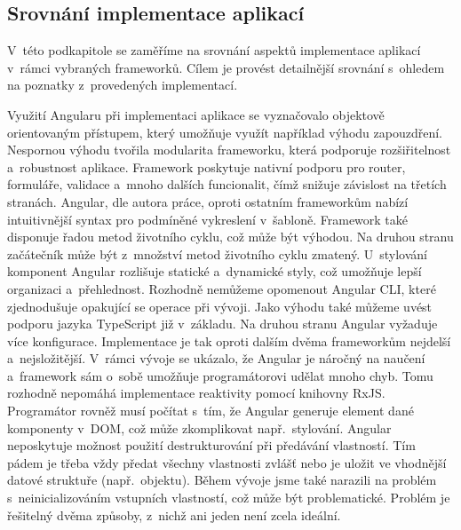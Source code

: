 \subsection{Srovnání implementace aplikací}

V~této podkapitole se zaměříme na srovnání aspektů implementace aplikací v~rámci vybraných frameworků. 
Cílem je provést detailnější srovnání s~ohledem na poznatky z~provedených implementací. 

Využití Angularu při implementaci aplikace se vyznačovalo objektově orientovaným přístupem, který umožňuje využít například výhodu zapouzdření. 
Nespornou výhodu tvořila modularita frameworku, která podporuje rozšiřitelnost a~robustnost aplikace. 
Framework poskytuje nativní podporu pro router, formuláře, validace a~mnoho dalších funcionalit, čímž snižuje závislost na třetích stranách. 
Angular, dle autora práce, oproti ostatním frameworkům nabízí intuitivnější syntax pro podmíněné vykreslení v~šabloně. 
Framework také disponuje řadou metod životního cyklu, což může být výhodou. Na druhou stranu začátečník může být z~množství metod životního cyklu zmatený. 
U~stylování komponent Angular rozlišuje statické a~dynamické styly, což umožňuje lepší organizaci a~přehlednost. 
Rozhodně nemůžeme opomenout Angular CLI, které zjednodušuje opakující se operace při vývoji. 
Jako výhodu také můžeme uvést podporu jazyka TypeScript již v~základu. 
Na druhou stranu Angular vyžaduje více konfigurace. Implementace je tak oproti dalším dvěma frameworkům nejdelší a~nejsložitější. 
V~rámci vývoje se ukázalo, že Angular je náročný na naučení a~framework sám o~sobě umožňuje programátorovi udělat mnoho chyb. 
Tomu rozhodně nepomáhá implementace reaktivity pomocí knihovny RxJS. 
Programátor rovněž musí počítat s~tím, že Angular generuje element dané komponenty v~DOM, což může zkomplikovat např.~stylování. 
Angular neposkytuje možnost použití destrukturování při předávání vlastností. 
Tím pádem je třeba vždy předat všechny vlastnosti zvlášť nebo je uložit ve vhodnější datové struktuře (např.~objektu).
Během vývoje jsme také narazili na problém s~neinicializováním vstupních vlastností, což může být problematické. 
Problém je řešitelný dvěma způsoby, z~nichž ani jeden není zcela ideální.


